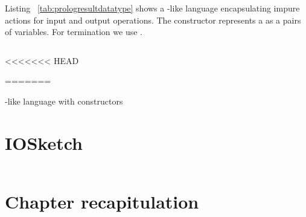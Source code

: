 \documentclass[thesis-solanki.tex]{subfiles}
\begin{document}
Listing ~\ref{tab:prologresultdatatype} shows a -like language encapsulating impure actions for input and output 
operations. The  constructor represents a  as a pairs of variables. For termination we use
. 


\begin{code-list}[H]
\begin{singlespace}

  \inputminted[linenos, firstline=7, lastline=16]{haskell}{haskell-proto4-platen-winkel.hs}
\end{singlespace}
<<<<<<< HEAD
\caption{}
\label{000588761}
=======
\caption{-like language with  constructors}
\label{tab:prologresultdatatype}
\end{code-list}


\section{IOSketch}

\begin{code-list}[H]
\begin{singlespace}
\inputminted[linenos]{haskell}{IOSketch.hs}
\end{singlespace}
\caption{}
\label{056385920}
\end{code-list}


\section{Chapter recapitulation}

\ifMain
\begin{scope}
  \nolinenumbers
  \enotesize
  \par
  \begin{singlespace}
  \setlength{\parskip}{12pt plus 2pt minus 1pt}
  \theendnotes
  \par
  \end{singlespace}
\end{scope}
\fi
\end{document}
